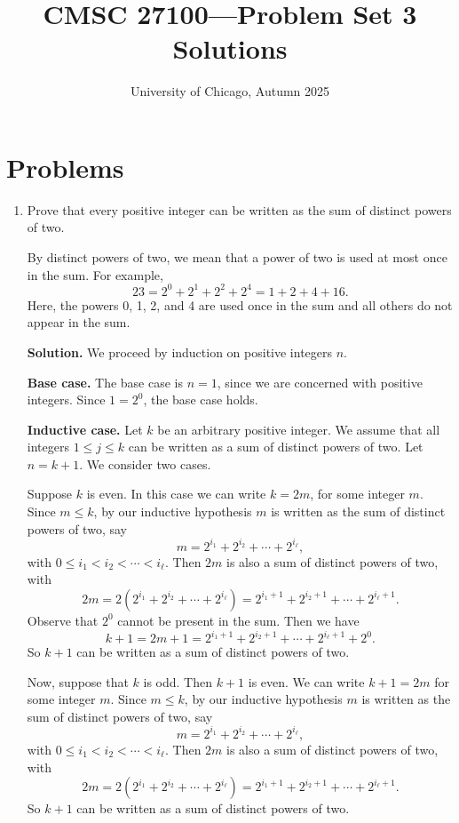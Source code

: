 \documentclass[11pt]{article}
\title{CMSC 27100---Problem Set 3 Solutions}
\author{University of Chicago, Autumn 2025}
\date{}
\begin{document}
\maketitle

\section*{Problems}

\begin{enumerate}[leftmargin=*]
  \item Prove that every positive integer can be written as the sum of distinct powers of two.

  By distinct powers of two, we mean that a power of two is used at most once in the sum. For example,
  \[
    23 = 2^0 + 2^1 + 2^2 + 2^4 = 1 + 2 + 4 + 16.
  \]
  Here, the powers 0, 1, 2, and 4 are used once in the sum and all others do not appear in the sum.

  \textbf{Solution.} We proceed by induction on positive integers $n$.

  \textbf{Base case.} The base case is $n=1$, since we are concerned with positive integers. Since $1=2^0$, the base case holds.

  \textbf{Inductive case.} Let $k$ be an arbitrary positive integer. We assume that all integers $1 \le j \le k$ can be written as a sum of distinct powers of two. Let $n = k + 1$. We consider two cases.

  Suppose $k$ is even. In this case we can write $k = 2m$, for some integer $m$. Since $m \le k$, by our inductive hypothesis $m$ is written as the sum of distinct powers of two, say
  \[
    m = 2^{i_1} + 2^{i_2} + \cdots + 2^{i_\ell},
  \]
  with $0 \le i_1 < i_2 < \cdots < i_\ell$. Then $2m$ is also a sum of distinct powers of two, with
  \[
    2m = 2\left(2^{i_1} + 2^{i_2} + \cdots + 2^{i_\ell}\right)
       = 2^{i_1+1} + 2^{i_2+1} + \cdots + 2^{i_\ell+1}.
  \]
  Observe that $2^0$ cannot be present in the sum. Then we have
  \[
    k+1 = 2m + 1 = 2^{i_1+1} + 2^{i_2+1} + \cdots + 2^{i_\ell+1} + 2^0.
  \]
  So $k+1$ can be written as a sum of distinct powers of two.

  Now, suppose that $k$ is odd. Then $k+1$ is even. We can write $k+1 = 2m$ for some integer $m$. Since $m \le k$, by our inductive hypothesis $m$ is written as the sum of distinct powers of two, say
  \[
    m = 2^{i_1} + 2^{i_2} + \cdots + 2^{i_\ell},
  \]
  with $0 \le i_1 < i_2 < \cdots < i_\ell$. Then $2m$ is also a sum of distinct powers of two, with
  \[
    2m = 2\left(2^{i_1} + 2^{i_2} + \cdots + 2^{i_\ell}\right)
       = 2^{i_1+1} + 2^{i_2+1} + \cdots + 2^{i_\ell+1}.
  \]
  So $k+1$ can be written as a sum of distinct powers of two.


\end{enumerate}
\end{document}
